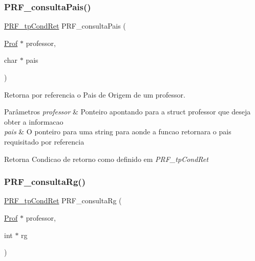 \subsubsection{\texorpdfstring{P\+R\+F\+\_\+consulta\+Pais()}{PRF\_consultaPais()}}
{\footnotesize\ttfamily \hyperlink{group__modulo_professor_ga777e215896d573d2e99d98793b1f0ed1}{P\+R\+F\+\_\+tp\+Cond\+Ret} P\+R\+F\+\_\+consulta\+Pais (\begin{DoxyParamCaption}\item[{\hyperlink{structprof}{Prof} $\ast$}]{professor,  }\item[{char $\ast$}]{pais }\end{DoxyParamCaption})}



Retorna por referencia o Pais de Origem de um professor. 


\begin{DoxyParams}{Parâmetros}
{\em professor} & Ponteiro apontando para a struct professor que deseja obter a informacao \\
\hline
{\em pais} & O ponteiro para uma string para aonde a funcao retornara o pais requisitado por referencia \\
\hline
\end{DoxyParams}
\begin{DoxyReturn}{Retorna}
Condicao de retorno como definido em {\itshape P\+R\+F\+\_\+tp\+Cond\+Ret} 
\end{DoxyReturn}
\mbox{\label{group__funcoes_consulta_ga231f378246f5583fb7e16c0f54958af8}} 
\subsubsection{\texorpdfstring{P\+R\+F\+\_\+consulta\+Rg()}{PRF\_consultaRg()}}
{\footnotesize\ttfamily \hyperlink{group__modulo_professor_ga777e215896d573d2e99d98793b1f0ed1}{P\+R\+F\+\_\+tp\+Cond\+Ret} P\+R\+F\+\_\+consulta\+Rg (\begin{DoxyParamCaption}\item[{\hyperlink{structprof}{Prof} $\ast$}]{professor,  }\item[{int $\ast$}]{rg }\end{DoxyParamCaption})}



